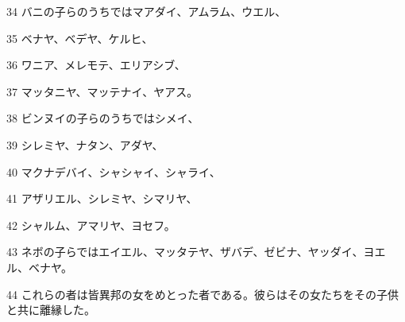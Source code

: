 \par 34 バニの子らのうちではマアダイ、アムラム、ウエル、
\par 35 ベナヤ、ベデヤ、ケルヒ、
\par 36 ワニア、メレモテ、エリアシブ、
\par 37 マッタニヤ、マッテナイ、ヤアス。
\par 38 ビンヌイの子らのうちではシメイ、
\par 39 シレミヤ、ナタン、アダヤ、
\par 40 マクナデバイ、シャシャイ、シャライ、
\par 41 アザリエル、シレミヤ、シマリヤ、
\par 42 シャルム、アマリヤ、ヨセフ。
\par 43 ネボの子らではエイエル、マッタテヤ、ザバデ、ゼビナ、ヤッダイ、ヨエル、ベナヤ。
\par 44 これらの者は皆異邦の女をめとった者である。彼らはその女たちをその子供と共に離縁した。


